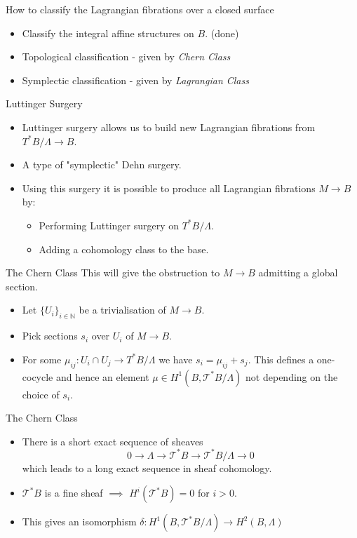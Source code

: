 \begin{frame}[c]{How to classify the Lagrangian fibrations over a closed surface}
	\begin{itemize}
		\item Classify the integral affine structures on $B$. (done)
		\item Topological classification - given by \emph{Chern Class}
		\item Symplectic classification - given by \emph{Lagrangian Class}
	\end{itemize}
\end{frame}

\begin{frame}[c]{Luttinger Surgery}
	\begin{itemize}
		\item Luttinger surgery allows us to build new Lagrangian fibrations from
		      $T^*B/\Lambda \to B$.
		\item A type of "symplectic" Dehn surgery.
		\item Using this surgery it is possible to produce all Lagrangian fibrations $M \to
			      B$ by:
		      \begin{itemize}
			      \item Performing Luttinger surgery on $T^*B/\Lambda$.
			      \item Adding a cohomology class to the base.
		      \end{itemize}
	\end{itemize}
\end{frame}

\begin{frame}[c]{The Chern Class}
	This will give the obstruction to $M \to B$ admitting a global section.
	\begin{itemize}
		\item Let $\{U_i\}_{i \in \mathbb{N}}$ be a trivialisation of $M \to B$.
		\item Pick sections $s_i$ over $U_i$ of $M \to B$.
		\item For some $\mu_{ij}: U_i \cap U_j \to T^*B/\Lambda$ we have $s_i = \mu_{ij} +
			      s_j $. This defines a one-cocycle and hence an element $\mu \in H^1(B,
			      \mathcal{T}^*B/\Lambda)$ not depending on the choice of $s_i$.
	\end{itemize}
\end{frame}

\begin{frame}[c]{The Chern Class}
	\begin{itemize}
		\item There is a short exact sequence of sheaves $$0 \to \Lambda \to \mathcal{T}^*B
			      \to \mathcal{T}^*B/\Lambda \to 0$$ which leads to a long exact sequence in
		      sheaf cohomology.
		\item $\mathcal{T}^*B$ is a fine sheaf $\implies$ $H^i(\mathcal{T}^*B)=0$ for $i>0$.
		\item This gives an isomorphism $\delta: H^1(B, \mathcal{T}^*B/\Lambda) \to H^2(B,
			      \Lambda)$
	\end{itemize}
\end{frame}

